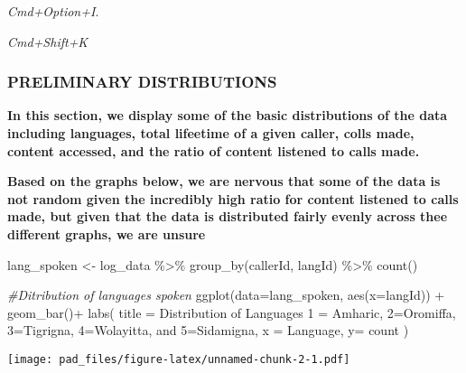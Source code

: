 \documentclass[
]{article}
\newenvironment{Shaded}{\begin{snugshade}}{\end{snugshade}}
\newcommand{\AttributeTok}[1]{\textcolor[rgb]{0.77,0.63,0.00}{#1}}
\newcommand{\CommentTok}[1]{\textcolor[rgb]{0.56,0.35,0.01}{\textit{#1}}}
\newcommand{\FunctionTok}[1]{\textcolor[rgb]{0.00,0.00,0.00}{#1}}
\newcommand{\NormalTok}[1]{#1}
\newcommand{\OtherTok}[1]{\textcolor[rgb]{0.56,0.35,0.01}{#1}}
\newcommand{\SpecialCharTok}[1]{\textcolor[rgb]{0.00,0.00,0.00}{#1}}
\newcommand{\StringTok}[1]{\textcolor[rgb]{0.31,0.60,0.02}{#1}}
\begin{document}
\emph{Cmd+Option+I}.

\emph{Cmd+Shift+K}

\hypertarget{preliminary-distributions}{%
\subsubsection{PRELIMINARY
DISTRIBUTIONS}\label{preliminary-distributions}}

\textbf{In this section, we display some of the basic distributions of
the data including languages, total lifeetime of a given caller, colls
made, content accessed, and the ratio of content listened to calls
made.}

\textbf{Based on the graphs below, we are nervous that some of the data
is not random given the incredibly high ratio for content listened to
calls made, but given that the data is distributed fairly evenly across
thee different graphs, we are unsure}

\begin{Shaded}
\begin{Highlighting}[]
\NormalTok{lang\_spoken }\OtherTok{\textless{}{-}}\NormalTok{ log\_data }\SpecialCharTok{\%\textgreater{}\%}
  \FunctionTok{group\_by}\NormalTok{(callerId, langId) }\SpecialCharTok{\%\textgreater{}\%}
  \FunctionTok{count}\NormalTok{()}

\CommentTok{\#Ditribution of languages spoken}
\FunctionTok{ggplot}\NormalTok{(}\AttributeTok{data=}\NormalTok{lang\_spoken, }\FunctionTok{aes}\NormalTok{(}\AttributeTok{x=}\NormalTok{langId)) }\SpecialCharTok{+}
  \FunctionTok{geom\_bar}\NormalTok{()}\SpecialCharTok{+}
  \FunctionTok{labs}\NormalTok{(}
    \AttributeTok{title =} \StringTok{\textquotesingle{}Distribution of Languages}
\StringTok{    1 = Amharic, 2=Oromiffa, 3=Tigrigna, 4=Wolayitta, and 5=Sidamigna\textquotesingle{}}\NormalTok{,}
    \AttributeTok{x =} \StringTok{\textquotesingle{}Language\textquotesingle{}}\NormalTok{,}
    \AttributeTok{y=} \StringTok{\textquotesingle{}count\textquotesingle{}}
\NormalTok{  )}
\end{Highlighting}
\end{Shaded}

\texttt{[image: pad\_files/figure-latex/unnamed-chunk-2-1.pdf]}
\end{document}
